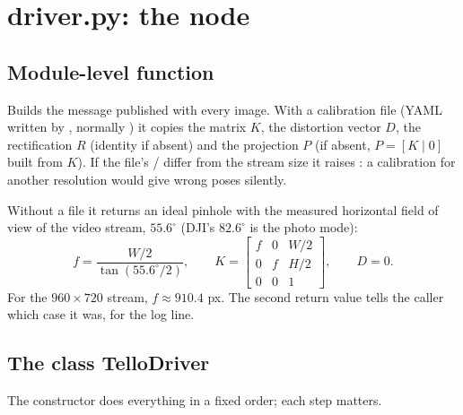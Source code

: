 \section{driver.py: the node}
\label{sec:driverpy}

\subsection{Module-level function}

Builds the  message published with every image. With a calibration file (YAML written by
, normally ) it copies the matrix $K$, the
distortion vector $D$, the rectification $R$ (identity if absent) and the projection $P$ (if absent,
$P=[K\mid 0]$ built from $K$). If the file's / differ from the stream size it
raises : a calibration for another resolution would give wrong poses silently.

Without a file it returns an ideal pinhole with the measured horizontal field of view of the video stream,
$55.6^\circ$ (DJI's $82.6^\circ$ is the photo mode):
$$
f = \frac{W/2}{\tan(55.6^\circ/2)}, \qquad
K = \begin{bmatrix} f & 0 & W/2 \\ 0 & f & H/2 \\ 0 & 0 & 1 \end{bmatrix}, \qquad D = 0 .
$$
For the $960\times720$ stream, $f \approx 910.4$ px. The second return value tells the caller which case it was,
for the log line.

\subsection{The class TelloDriver}

The constructor does everything in a fixed order; each step matters.

